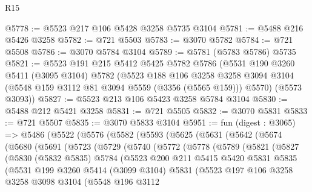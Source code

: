 \begin{lexlean}{R15}
\begin{coremodule}
@5778 := @5523 @217 @106 @5428 @3258 @5735 @3104
@5781 := @5488 @216 @5426 @3258
@5782 := @721 @5503
@5783 := @3070 @5782
@5784 := @721 @5508
@5786 := @3070 @5784 @3104
@5789 := @5781 (@5783 @5786) @5735
@5821 := @5523
    @191
    @215
    @5412
    @5425
    @5782
    @5786
    (@5531
      @190
      @3260
      @5411
      (@3095 @3104)
      @5782
      (@5523
        @188
        @106
        @3258
        @3258
        @3094
        @3104
        (@5548 @159 @3112 @81 @3094 @5559 (@3356 (@5565 @159)))
        @5570)
      (@5573 @3093))
@5827 := @5523 @213 @106 @5423 @3258 @5784 @3104
@5830 := @5488 @212 @5421 @3258
@5831 := @721 @5505
@5832 := @3070 @5831
@5833 := @721 @5507
@5835 := @3070 @5833 @3104
@5951 := fun (digest : @3065) =>
  @5486
    (@5522
      (@5576
        (@5582
          (@5593
            (@5625
              (@5631
                (@5642
                  (@5674
                    (@5680
                      (@5691
                        (@5723
                          (@5729
                            (@5740
                              (@5772
                                (@5778
                                  (@5789
                                    (@5821
                                      (@5827
                                        (@5830
                                          (@5832 @5835)
                                          @5784
                                          (@5523
                                            @200
                                            @211
                                            @5415
                                            @5420
                                            @5831
                                            @5835
                                            (@5531
                                              @199
                                              @3260
                                              @5414
                                              (@3099 @3104)
                                              @5831
                                              (@5523
                                                @197
                                                @106
                                                @3258
                                                @3258
                                                @3098
                                                @3104
                                                (@5548
                                                  @196
                                                  @3112

\end{coremodule}
\end{lexlean}
